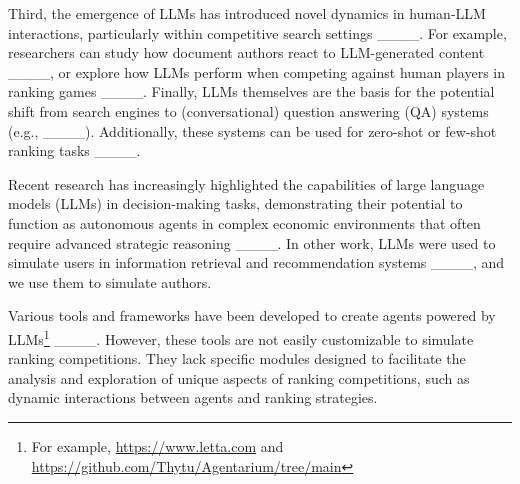 Third, the emergence of LLMs has introduced novel dynamics in human-LLM interactions, particularly within competitive search settings ____. For example, researchers can study how document authors react to LLM-generated content ____, or explore how LLMs perform when competing against human players in ranking games ____. Finally, LLMs themselves are the basis for the potential shift from search engines to (conversational) question answering (QA) systems (e.g., ____). Additionally, these systems can be used for zero-shot or few-shot ranking tasks ____.



 Recent research has increasingly highlighted the capabilities of large language models (LLMs) in decision-making tasks, demonstrating their potential to function as autonomous agents in complex economic environments that often require advanced strategic reasoning ____. In other work, LLMs were used to simulate users in information retrieval and recommendation systems ____, and we use them to simulate authors.

 Various tools and frameworks have been developed to create agents powered by LLMs\footnote{For example, \url{https://www.letta.com} and \url{https://github.com/Thytu/Agentarium/tree/main}} ____. However, these tools are not easily customizable to simulate ranking competitions. They lack specific modules designed to facilitate the analysis and exploration of unique aspects of ranking competitions, such as dynamic interactions between agents and ranking strategies.